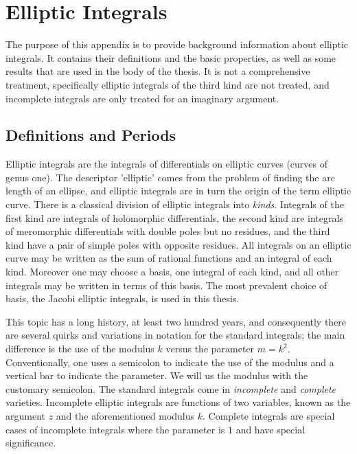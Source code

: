 
\section{Elliptic Integrals}
\label{sec:Elliptic Integrals}

The purpose of this appendix is to provide background information about elliptic integrals. It contains their definitions and the basic properties, as well as some results that are used in the body of the thesis. It is not a comprehensive treatment, specifically elliptic integrals of the third kind are not treated, and incomplete integrals are only treated for an imaginary argument.

\subsection{Definitions and Periods}
Elliptic integrals are the integrals of differentials on elliptic curves (curves of genus one). The descriptor 'elliptic' comes from the problem of finding the arc length of an ellipse, and elliptic integrals are in turn the origin of the term elliptic curve. There is a classical division of elliptic integrals into \emph{kinds}. Integrals of the first kind are integrals of holomorphic differentials, the second kind are integrals of meromorphic differentials with double poles but no residues, and the third kind have a pair of simple poles with opposite residues. All integrals on an elliptic curve may be written as the sum of rational functions and an integral of each kind. Moreover one may choose a basis, one integral of each kind, and all other integrals may be written in terms of this basis. The most prevalent choice of basis, the Jacobi elliptic integrals, is used in this thesis.

This topic has a long history, at least two hundred years, and consequently there are several quirks and variations in notation for the standard integrals; the main difference is the use of the modulus $k$ versus the parameter $m = k^2$. Conventionally, one uses a semicolon to indicate the use of the modulus and a vertical bar to indicate the parameter. We will us the modulus with the customary semicolon. The standard integrals come in {\it incomplete} and {\it complete} varieties. Incomplete elliptic integrals are functions of two variables, known as the argument $z$ and the aforementioned modulus $k$. Complete integrals are special cases of incomplete integrals where the parameter is $1$ and have special significance.


